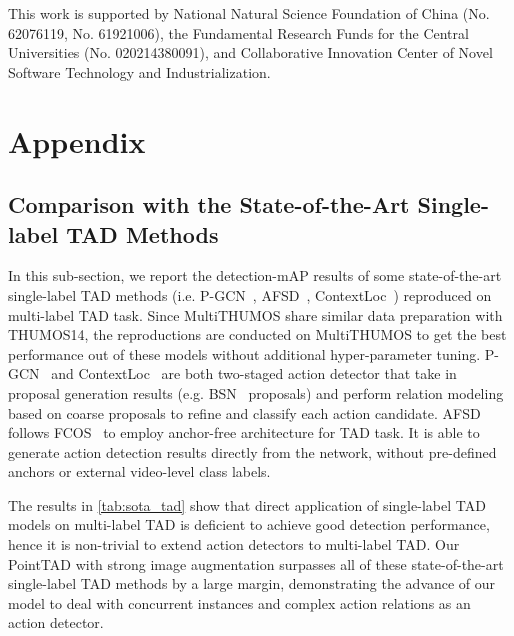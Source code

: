 \documentclass{article}
\begin{document}
\begin{ack}
{This work is supported by National Natural Science Foundation of China (No. 62076119, No. 61921006), the Fundamental Research Funds for the Central Universities (No. 020214380091), and Collaborative Innovation Center of Novel Software Technology and Industrialization.}
\end{ack}


{\small


}

\clearpage

\newpage

\appendix

\section{Appendix}


\subsection{Comparison with the State-of-the-Art Single-label TAD Methods}
In this sub-section, we report the detection-mAP results of some state-of-the-art single-label TAD methods (i.e. P-GCN~\cite{DBLP:conf/iccv/ZengHGTRZH19}, AFSD~\cite{DBLP:conf/cvpr/Lin0LWTWLHF21}, ContextLoc~\cite{DBLP:conf/iccv/ZhuT00021}) reproduced on multi-label TAD task. 
Since MultiTHUMOS share similar data preparation with THUMOS14, the reproductions are conducted on MultiTHUMOS to get the best performance out of these models without additional hyper-parameter tuning. 
P-GCN~\cite{DBLP:conf/iccv/ZengHGTRZH19} and ContextLoc~\cite{DBLP:conf/iccv/ZhuT00021} are both two-staged action detector that take in proposal generation results (e.g. BSN~\cite{DBLP:conf/eccv/LinZSWY18} proposals) and perform relation modeling based on coarse proposals to refine and classify each action candidate.
AFSD~\cite{DBLP:conf/cvpr/Lin0LWTWLHF21} follows FCOS~\cite{DBLP:conf/iccv/TianSCH19} to employ anchor-free architecture for TAD task. It is able to generate action detection results directly from the network, without pre-defined anchors or external video-level class labels.

The results in \cref{tab:sota_tad} show that direct application of single-label TAD models on multi-label TAD is deficient to achieve good detection performance, hence it is non-trivial to extend action detectors to multi-label TAD. Our PointTAD with strong image augmentation surpasses all of these state-of-the-art single-label TAD methods by a large margin, demonstrating the advance of our model to deal with concurrent instances and complex action relations as an action detector. 
\end{document}
